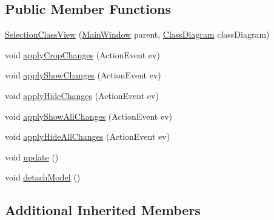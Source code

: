 \subsection*{Public Member Functions}
\begin{DoxyCompactItemize}
\item 
\hyperlink{classorg_1_1tzi_1_1use_1_1gui_1_1views_1_1selection_1_1classselection_1_1_selection_class_view_abf32fdb8aa6fbf453ab2e3e273342963}{Selection\-Class\-View} (\hyperlink{classorg_1_1tzi_1_1use_1_1gui_1_1main_1_1_main_window}{Main\-Window} parent, \hyperlink{classorg_1_1tzi_1_1use_1_1gui_1_1views_1_1diagrams_1_1classdiagram_1_1_class_diagram}{Class\-Diagram} class\-Diagram)
\item 
void \hyperlink{classorg_1_1tzi_1_1use_1_1gui_1_1views_1_1selection_1_1classselection_1_1_selection_class_view_a76691acc2402505757f86507d216a70b}{apply\-Crop\-Changes} (Action\-Event ev)
\item 
void \hyperlink{classorg_1_1tzi_1_1use_1_1gui_1_1views_1_1selection_1_1classselection_1_1_selection_class_view_a201ba23260ab92854238e8b203bf239c}{apply\-Show\-Changes} (Action\-Event ev)
\item 
void \hyperlink{classorg_1_1tzi_1_1use_1_1gui_1_1views_1_1selection_1_1classselection_1_1_selection_class_view_a1cc71c85bc12642c082c9a06fe05d1b0}{apply\-Hide\-Changes} (Action\-Event ev)
\item 
void \hyperlink{classorg_1_1tzi_1_1use_1_1gui_1_1views_1_1selection_1_1classselection_1_1_selection_class_view_a8409f13f8922738db4e1bfb40c3ce4ae}{apply\-Show\-All\-Changes} (Action\-Event ev)
\item 
void \hyperlink{classorg_1_1tzi_1_1use_1_1gui_1_1views_1_1selection_1_1classselection_1_1_selection_class_view_acabc94c6eec54aa285fde8e2df8d8bed}{apply\-Hide\-All\-Changes} (Action\-Event ev)
\item 
void \hyperlink{classorg_1_1tzi_1_1use_1_1gui_1_1views_1_1selection_1_1classselection_1_1_selection_class_view_a44c8efef47da0ebe09c1ded57e3a80d5}{update} ()
\item 
void \hyperlink{classorg_1_1tzi_1_1use_1_1gui_1_1views_1_1selection_1_1classselection_1_1_selection_class_view_adfbeaffc48e2f2b74829be6ee1eb3eed}{detach\-Model} ()
\end{DoxyCompactItemize}
\subsection*{Additional Inherited Members}



